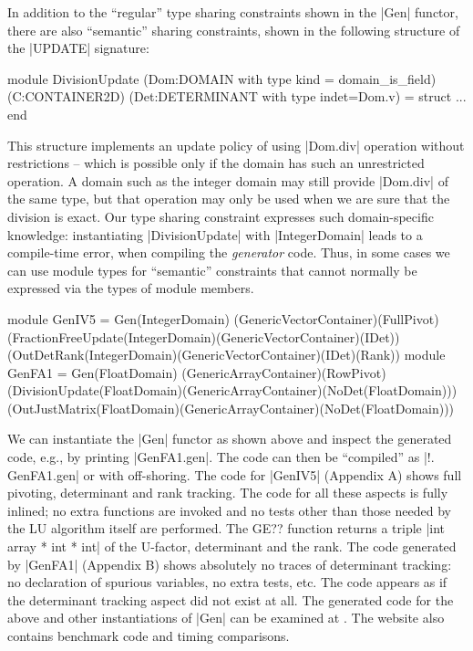 \documentclass[draft]{elsart}
\begin{document}
In addition to the ``regular'' type sharing constraints shown in the
|Gen| functor, there are also ``semantic'' sharing constraints, shown
in the following structure of the |UPDATE| signature:
\vspace*{-5pt}\begin{code}
module DivisionUpdate
  (Dom:DOMAIN with type kind = domain_is_field)
  (C:CONTAINER2D)
  (Det:DETERMINANT with type indet=Dom.v) = struct ... end
\end{code}
\vspace*{-4pt} 
This structure implements an update policy of using
|Dom.div| operation without restrictions -- which is possible only if
the domain has such an unrestricted operation. A domain such as the integer
domain may still provide |Dom.div| of the same type, but that operation may
only be used when we are sure that the division is exact. Our type
sharing constraint expresses such domain-specific knowledge:
instantiating |DivisionUpdate| with |IntegerDomain| leads to a
compile-time error, when compiling the \emph{generator} code. Thus, in
some cases we can use module types for ``semantic'' constraints
that cannot normally be expressed via the types of module members.
\vspace*{-5pt}
\begin{code}
module GenIV5 = Gen(IntegerDomain)
   (GenericVectorContainer)(FullPivot)
   (FractionFreeUpdate(IntegerDomain)(GenericVectorContainer)(IDet))
   (OutDetRank(IntegerDomain)(GenericVectorContainer)(IDet)(Rank))
module GenFA1 = Gen(FloatDomain)
   (GenericArrayContainer)(RowPivot)
   (DivisionUpdate(FloatDomain)(GenericArrayContainer)(NoDet(FloatDomain)))
   (OutJustMatrix(FloatDomain)(GenericArrayContainer)(NoDet(FloatDomain)))
\end{code}
\vspace*{-5pt}
We can instantiate the |Gen| functor as shown above and inspect the generated
code, e.g., by printing |GenFA1.gen|. The code can then be ``compiled'' as 
|!. GenFA1.gen| or with off-shoring. The code for |GenIV5| (Appendix A) shows
full pivoting, determinant and rank tracking. The code for all these aspects is
fully inlined; no extra functions are invoked and no tests other than those
needed by the LU algorithm itself are performed. The GE?? function returns a
triple |int array * int * int| of the U-factor, determinant and the rank. The
code generated by |GenFA1| (Appendix B) shows absolutely no traces of
determinant tracking: no declaration of spurious variables, no extra tests,
etc. The code appears as if the determinant tracking aspect did not exist
at all. The generated code for the above and other instantiations of
|Gen| can be examined at \cite{metamonadsURL}. The website also 
contains benchmark code and timing comparisons.
\end{document}
